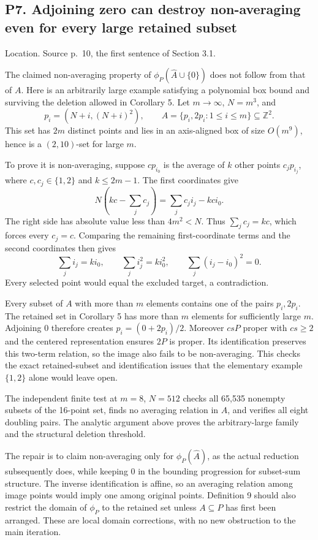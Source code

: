 \documentclass[10pt]{article}
\begin{document}
\subsection*{P7. Adjoining zero can destroy non-averaging even for every large retained subset}
Location. Source p. 10, the first sentence of Section 3.1.\par
The claimed non-averaging property of \(\phi_P(\widehat A\cup\{0\})\) does not follow from that of \(A\). Here is an arbitrarily large example satisfying a polynomial box bound and surviving the deletion allowed in Corollary 5. Let \(m\to\infty\), \(N=m^3\), and \[p_i=(N+i,(N+i)^2),\qquad
 A=\{p_i,2p_i:1\le i\le m\}\subseteq\mathbb Z^2.\] This set has \(2m\) distinct points and lies in an axis-aligned box of size \(O(m^9)\), hence is a \((2,10)\)-set for large \(m\).\par
To prove it is non-averaging, suppose \(cp_{i_0}\) is the average of \(k\) other points \(c_jp_{i_j}\), where \(c,c_j\in\{1,2\}\) and \(k\le2m-1\). The first coordinates give \[N\left(kc-\sum_jc_j\right)=\sum_jc_ji_j-kci_0.\] The right side has absolute value less than \(4m^2<N\). Thus \(\sum_jc_j=kc\), which forces every \(c_j=c\). Comparing the remaining first-coordinate terms and the second coordinates then gives \[\sum_ji_j=ki_0,\qquad \sum_ji_j^2=ki_0^2,\qquad
 \sum_j(i_j-i_0)^2=0.\] Every selected point would equal the excluded target, a contradiction.\par
Every subset of \(A\) with more than \(m\) elements contains one of the pairs \(p_i,2p_i\). The retained set in Corollary 5 has more than \(m\) elements for sufficiently large \(m\). Adjoining \(0\) therefore creates \(p_i=(0+2p_i)/2\). Moreover \(csP\) proper with \(cs\ge2\) and the centered representation ensures \(2P\) is proper. Its identification preserves this two-term relation, so the image also fails to be non-averaging. This checks the exact retained-subset and identification issues that the elementary example \(\{1,2\}\) alone would leave open.\par
The independent finite test at \(m=8\), \(N=512\) checks all 65,535 nonempty subsets of the 16-point set, finds no averaging relation in \(A\), and verifies all eight doubling pairs. The analytic argument above proves the arbitrary-large family and the structural deletion threshold.\par
The repair is to claim non-averaging only for \(\phi_P(\widehat A)\), as the actual reduction subsequently does, while keeping \(0\) in the bounding progression for subset-sum structure. The inverse identification is affine, so an averaging relation among image points would imply one among original points. Definition 9 should also restrict the domain of \(\phi_P\) to the retained set unless \(A\subseteq P\) has first been arranged. These are local domain corrections, with no new obstruction to the main iteration.\par
\end{document}
